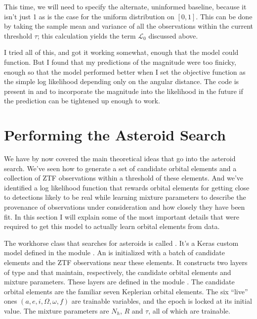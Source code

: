This time, we will need to specify the alternate, uninformed baseline, because it isn't just 1 as is the case for the uniform distribution on $[0,1]$.
This can be done by taking the sample mean and variance of all the observations within the current threshold $\tau$;
this calculation yields the term $\mathcal{L}_0$ discussed above.

I tried all of this, and got it working somewhat, enough that the model could function.
But I found that my predictions of the magnitude were too finicky, enough so that the model performed better when 
I set the objective function as the simple log likelihood depending only on the angular distance.
The code is present in  and  to incorporate the magnitude 
into the likelihood in the future if the prediction can be tightened up enough to work.

\section{Performing the Asteroid Search}
\label{section_asteroid_search}
We have by now covered the main theoretical ideas that go into the asteroid search.
We've seen how to generate a set of candidate orbital elements and a collection of ZTF observations within a threshold of these elements.
And we've identified a log likelihood function that rewards orbital elements for getting close to detections likely to be real 
while learning mixture parameters to describe the provenance of observations under consideration and how closely they have been fit.
In this section I will explain some of the most important details that were required to get this model to actually learn orbital elements from data.

The workhorse class that searches for asteroids is called .  
It's a Keras custom model defined in the module .
An  is initialized with a batch of candidate elements and the ZTF observations near these elements.
It constructs two layers of type  and  that maintain, respectively, 
the candidate orbital elements and mixture parameters.
These layers are defined in the module .
The candidate orbital elements are the familiar seven Keplerian orbital elements.
The six ``live'' ones $(a, e, i, \Omega, \omega, f)$ are trainable variables, and the epoch is locked at its initial value.
The mixture parameters are $N_h$, $R$ and $\tau$, all of which are trainable.

